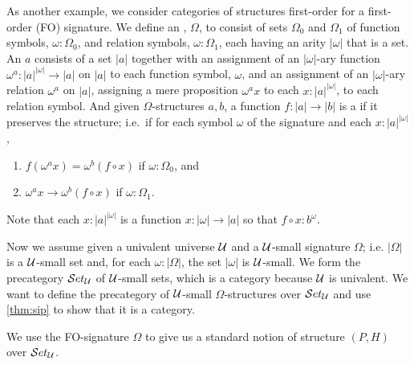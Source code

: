 As another example, we consider categories of structures first-order for a first-order (FO) signature.
We define an , $\Omega$, to consist of sets $\Omega_0$ and $\Omega_1$ of function symbols, $\omega:\Omega_0$, and relation symbols, $\omega:\Omega_1$, each having an arity $|\omega|$ that is a set.
An  $a$ consists of a set $|a|$ together with an assignment of an $|\omega|$-ary function $\omega^a:|a|^{|\omega|}\to |a|$ on $|a|$ to each function symbol, $\omega$, and an assignment of an $|\omega|$-ary relation $\omega^a$ on $|a|$, assigning a mere proposition $\omega^ax$ to each $x:|a|^{|\omega|}$, to each relation symbol.
And given $\Omega$-structures $a,b$, a function $f:|a|\to |b|$ is a  if it preserves the structure; i.e.\ if for each symbol $\omega$ of the signature and each $x:|a|^{|\omega|}$,
\begin{enumerate}
\item $f(\omega^ax) = \omega^b(f\circ x)$ if $\omega:\Omega_0$, and
\item $\omega^ax\to\omega^b(f\circ x)$ if $\omega:\Omega_1$.
\end{enumerate}
Note that each $x:|a|^{|\omega|}$ is a function $x:|\omega|\to |a|$ so that $f\circ x : b^\omega$.

Now we assume given a univalent universe $\mathcal{U}$ and a $\mathcal{U}$-small signature $\Omega$; i.e. $|\Omega|$ is a $\mathcal{U}$-small set and, for each $\omega:|\Omega|$, the set $|\omega|$ is $\mathcal{U}$-small.
We form the precategory $\mathcal{S}et_\mathcal{U}$ of $\mathcal{U}$-small sets, which is a category because $\mathcal{U}$ is univalent.  We want to define the precategory of $\mathcal{U}$-small $\Omega$-structures over $\mathcal{S}et_\mathcal{U}$ and use \autoref{thm:sip} to show that it is a category.

We use the FO-signature $\Omega$ to give us a standard notion of structure $(P,H)$ over $\mathcal{S}et_\mathcal{U}$.  

